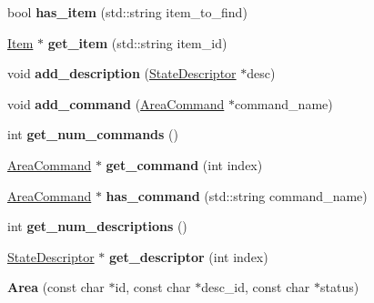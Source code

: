 \begin{DoxyCompactItemize}
\item 
\hypertarget{class_area_adcc60d9dea5808c8bb0e21d672667b29}{
bool {\bfseries has\_\-item} (std::string item\_\-to\_\-find)}
\label{class_area_adcc60d9dea5808c8bb0e21d672667b29}

\item 
\hypertarget{class_area_a8b4daa5e9165d10d8f1bede67a82ebe1}{
\hyperlink{class_item}{Item} $\ast$ {\bfseries get\_\-item} (std::string item\_\-id)}
\label{class_area_a8b4daa5e9165d10d8f1bede67a82ebe1}

\item 
\hypertarget{class_area_a27101dd552a05cebb467f108a5246278}{
void {\bfseries add\_\-description} (\hyperlink{class_state_descriptor}{StateDescriptor} $\ast$desc)}
\label{class_area_a27101dd552a05cebb467f108a5246278}

\item 
\hypertarget{class_area_a61f8a73da43dbfa8259a308cb61a28f0}{
void {\bfseries add\_\-command} (\hyperlink{class_area_command}{AreaCommand} $\ast$command\_\-name)}
\label{class_area_a61f8a73da43dbfa8259a308cb61a28f0}

\item 
\hypertarget{class_area_a4ba46fedbf3da57ca8bc6de3f50de0a4}{
int {\bfseries get\_\-num\_\-commands} ()}
\label{class_area_a4ba46fedbf3da57ca8bc6de3f50de0a4}

\item 
\hypertarget{class_area_ad76c8c8174738e806b85b1eb21f89d54}{
\hyperlink{class_area_command}{AreaCommand} $\ast$ {\bfseries get\_\-command} (int index)}
\label{class_area_ad76c8c8174738e806b85b1eb21f89d54}

\item 
\hypertarget{class_area_a698117843155cede5e11bbe3ff2e20e4}{
\hyperlink{class_area_command}{AreaCommand} $\ast$ {\bfseries has\_\-command} (std::string command\_\-name)}
\label{class_area_a698117843155cede5e11bbe3ff2e20e4}

\item 
\hypertarget{class_area_a917fe473912d321f631be8e1b30e5edf}{
int {\bfseries get\_\-num\_\-descriptions} ()}
\label{class_area_a917fe473912d321f631be8e1b30e5edf}

\item 
\hypertarget{class_area_a117aebce322e62d7402e5c36de7475c6}{
\hyperlink{class_state_descriptor}{StateDescriptor} $\ast$ {\bfseries get\_\-descriptor} (int index)}
\label{class_area_a117aebce322e62d7402e5c36de7475c6}

\item 
\hypertarget{class_area_afa6f67fe88559c8dbc5fbd1fbc73d8a2}{
{\bfseries Area} (const char $\ast$id, const char $\ast$desc\_\-id, const char $\ast$status)}
\label{class_area_afa6f67fe88559c8dbc5fbd1fbc73d8a2}

\end{DoxyCompactItemize}
